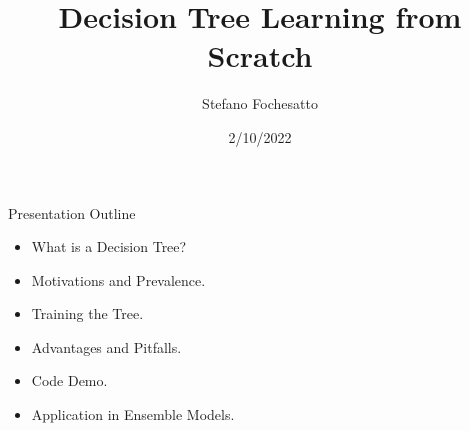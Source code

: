 \documentclass[xcolor={svgnames},
               hyperref={colorlinks,citecolor=DeepPink4,linkcolor=FireBrick,urlcolor=Maroon}]
               {beamer}
\title{Decision Tree Learning from Scratch}
\author{Stefano Fochesatto}
\institute[UAF]{MATH 692 Mathematics for Machine Learning}
\date[Spring 2022]{2/10/2022}
\begin{document}
\beamertemplatenavigationsymbolsempty

\begin{frame}
  \maketitle
\end{frame}

\begin{frame}{Presentation Outline}
  \begin{itemize}
  \item What is a Decision Tree?
  \vfill
  \item Motivations and Prevalence.
  \vfill
  \item Training the Tree.
  \vfill
  \item Advantages and Pitfalls.
  \vfill
  \item Code Demo.
  \vfill
  \item Application in Ensemble Models.
  \end{itemize}
\end{frame}
\end{document}
